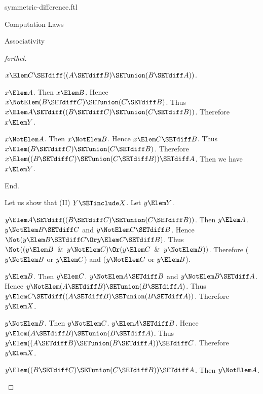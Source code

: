 \documentclass{stex}
\begin{document}
\begin{smodule}{symmetric-difference.ftl}
\begin{sfragment}{Computation Laws}
\begin{sfragment}{Associativity}
\begin{proof}[forthel]
\begin{case}{$x \Elem C \SETdiff ((A \SETdiff B) \SETunion (B \SETdiff A))$.}
          \begin{case}{$x \Elem A$.}
            Then $x \Elem B$.
            Hence $x \NotElem (B \SETdiff C) \SETunion (C \SETdiff B)$.
            Thus $x \Elem A \SETdiff ((B \SETdiff C) \SETunion (C \SETdiff B))$.
            Therefore $x \Elem Y$.
          \end{case}

          \begin{case}{$x \NotElem A$.}
            Then $x \NotElem B$.
            Hence $x \Elem C \SETdiff B$.
            Thus $x \Elem (B \SETdiff C) \SETunion (C \SETdiff B)$.
            Therefore $x \Elem ((B \SETdiff C) \SETunion (C \SETdiff B)) \SETdiff A$.
            Then we have $x \Elem Y$.
          \end{case}
        \end{case}
      End.

      Let us show that (II) $Y \SETinclude X$.
        Let $y \Elem Y$.

        \begin{case}{$y \Elem A \SETdiff ((B \SETdiff C) \SETunion (C \SETdiff B))$.}
          Then $y \Elem A$.
          $y \NotElem B \SETdiff C$ and $y \NotElem C \SETdiff B$.
          Hence $\Not(y \Elem B \SETdiff C \Or y \Elem C \SETdiff B)$.
          Thus $\Not((y \Elem B \And y \NotElem C) \Or (y \Elem C \And y \NotElem B))$.
          Therefore ($y \NotElem B$ or $y \Elem C$) and ($y \NotElem C$ or $y \Elem B$).

          \begin{case}{$y \Elem B$.}
            Then $y \Elem C$.
            $y \NotElem A \SETdiff B$ and $y \NotElem B \SETdiff A$.
            Hence $y \NotElem (A \SETdiff B) \SETunion (B \SETdiff A)$.
            Thus $y \Elem C \SETdiff ((A \SETdiff B) \SETunion (B \SETdiff A))$.
            Therefore $y \Elem X$.
          \end{case}

          \begin{case}{$y \NotElem B$.}
            Then $y \NotElem C$.
            $y \Elem A \SETdiff B$.
            Hence $y \Elem (A \SETdiff B) \SETunion (B \SETdiff A)$.
            Thus $y \Elem ((A \SETdiff B) \SETunion (B \SETdiff A)) \SETdiff C$.
            Therefore $y \Elem X$.
          \end{case}
        \end{case}

        \begin{case}{$y \Elem ((B \SETdiff C) \SETunion (C \SETdiff B)) \SETdiff A$.}
          Then $y \NotElem A$.


\end{case}
\end{proof}
\end{sfragment}
\end{sfragment}
\end{smodule}
\end{document}
